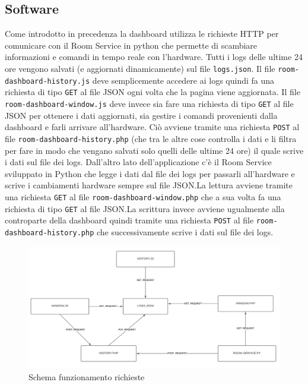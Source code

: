 \documentclass[12pt]{article}
\def\code#1{\texttt{#1}}
\begin{document}
\subsection{Software}
Come introdotto in precedenza la dashboard utilizza le richieste HTTP per comunicare con il Room Service in python che permette di scambiare informazioni e comandi in tempo reale con l'hardware.\newline
Tutti i logs delle ultime 24 ore vengono salvati (e aggiornati dinamicamente) sul file \code{logs.json}.\newline
Il file \code{room-dashboard-history.js} deve semplicemente accedere ai logs quindi fa una richiesta di tipo \code{GET} al file JSON ogni volta che la pagina viene aggiornata.\newline
Il file \code{room-dashboard-window.js} deve invece sia fare una richiesta di tipo \code{GET} al file JSON per ottenere i dati aggiornati, sia gestire i comandi provenienti dalla dashboard e farli arrivare all'hardware. Ciò avviene tramite una richiesta \code{POST} al file \code{room-dashboard-history.php} (che tra le altre cose controlla i dati e li filtra per fare in modo che vengano salvati solo quelli delle ultime 24 ore) il quale scrive i dati sul file dei logs.\newline
Dall'altro lato dell'applicazione c'è il Room Service sviluppato in Python che legge i dati dal file dei logs per passarli all'hardware e scrive i cambiamenti hardware sempre sul file JSON.\@ La lettura avviene tramite una richiesta \code{GET} al file \code{room-dashboard-window.php} che a sua volta fa una richiesta di tipo \code{GET} al file JSON.\@ La scrittura invece avviene ugualmente alla controparte della dashboard quindi tramite una richiesta \code{POST} al file \code{room-dashboard-history.php} che successivamente scrive i dati sul file dei logs.
\begin{figure}[H]
    \includegraphics[width=17cm]{dashboard-requests-schema.png}
    \centering
    \caption{Schema funzionamento richieste}
    \centering
\end{figure}
\end{document}
